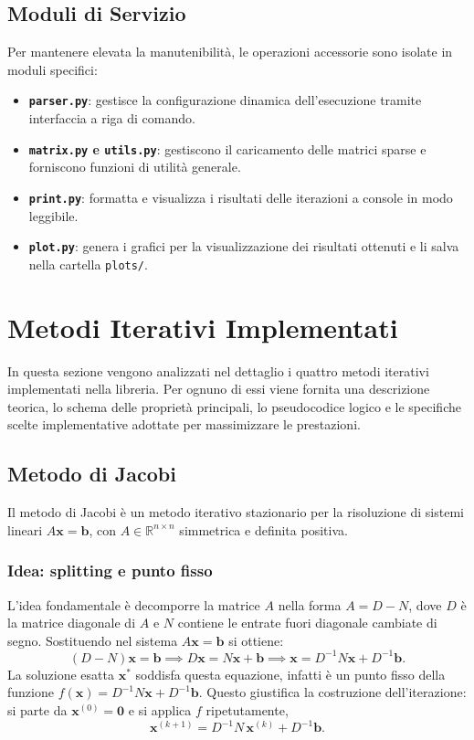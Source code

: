 \documentclass[a4paper, 12pt]{report}
\begin{document}
\section{Moduli di Servizio}
Per mantenere elevata la manutenibilità, le operazioni accessorie sono isolate in moduli specifici:
\begin{itemize}
    \item \textbf{\texttt{parser.py}}: gestisce la configurazione dinamica dell'esecuzione tramite interfaccia a riga di comando.
    \item \textbf{\texttt{matrix.py} e \texttt{utils.py}}: gestiscono il caricamento delle matrici sparse e forniscono funzioni di utilità generale.
    \item \textbf{\texttt{print.py}}: formatta e visualizza i risultati delle iterazioni a console in modo leggibile.
    \item \textbf{\texttt{plot.py}}: genera i grafici per la visualizzazione dei risultati ottenuti e li salva nella cartella \texttt{plots/}.
\end{itemize}


\chapter{Metodi Iterativi Implementati}
In questa sezione vengono analizzati nel dettaglio i quattro metodi iterativi implementati nella libreria. Per ognuno di essi viene fornita una descrizione teorica, lo schema delle proprietà principali, lo pseudocodice logico e le specifiche scelte implementative adottate per massimizzare le prestazioni.

\section{Metodo di Jacobi}

Il metodo di Jacobi è un metodo iterativo stazionario per la risoluzione
di sistemi lineari $A\mathbf{x} = \mathbf{b}$, con $A \in \mathbb{R}^{n
\times n}$ simmetrica e definita positiva.

\subsection*{Idea: splitting e punto fisso}

L'idea fondamentale è decomporre la matrice $A$ nella forma $A = D - N$,
dove $D$ è la matrice diagonale di $A$ e $N$ contiene le entrate
fuori diagonale cambiate di segno. Sostituendo nel sistema $A\mathbf{x} =
\mathbf{b}$ si ottiene:
\[
    (D - N)\mathbf{x} = \mathbf{b}
    \implies
    D\mathbf{x} = N\mathbf{x} + \mathbf{b}
    \implies
    \mathbf{x} = D^{-1}N\mathbf{x} + D^{-1}\mathbf{b}.
\]
La soluzione esatta $\mathbf{x}^*$ soddisfa questa equazione, infatti è un
punto fisso della funzione $f(\mathbf{x}) = D^{-1}N\mathbf{x} +
D^{-1}\mathbf{b}$. Questo giustifica la costruzione dell'iterazione: si
parte da $\mathbf{x}^{(0)} = \mathbf{0}$ e si applica $f$ ripetutamente,
\[
    \mathbf{x}^{(k+1)} = D^{-1}N\,\mathbf{x}^{(k)} + D^{-1}\mathbf{b}.
    \tag{Jacobi}
\]
\end{document}
